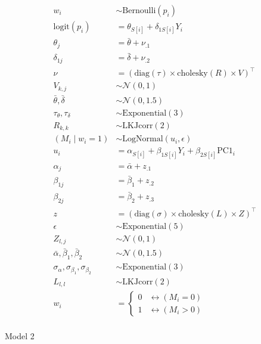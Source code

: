 \documentclass[
  letterpaper,
  DIV=11,
  numbers=noendperiod]{scrartcl}
\makeatletter
\let\oldparagraph\paragraph
\renewcommand{\paragraph}{
    \@ifstar
      \xxxParagraphStar
      \xxxParagraphNoStar
  }
\newcommand{\xxxParagraphStar}[1]{\oldparagraph*{#1}\mbox{}}
\newcommand{\xxxParagraphNoStar}[1]{\oldparagraph{#1}\mbox{}}
\makeatother
\begin{document}
\[
\begin{aligned}
w_i &\sim \mathrm{Bernoulli}(p_i) \\
\text{logit}(p_i) &= \theta_{S[i]} + \delta_{1S[i]} Y_i \\
\theta_j &= \bar{\theta} + \nu_{.1} \\
\delta_{1j} &= \bar{\delta} + \nu_{.2} \\
\nu &= \left( \mathrm{diag}(\tau) \times \mathrm{cholesky}(R) \times V \right)^\top \\
V_{k,j} &\sim \mathcal{N}(0, 1) \\
\bar{\theta}, \bar{\delta} &\sim \mathcal{N}(0, 1.5) \\
\tau_\theta, \tau_\delta &\sim \mathrm{Exponential}(3) \\
R_{k,k} &\sim \mathrm{LKJcorr}(2) \\
(M_i \mid w_i = 1) &\sim \mathrm{LogNormal}(u_i, \epsilon) \\
u_i &= \alpha_{S[i]} + \beta_{1S[i]} Y_i + \beta_{2S[i]} \mathrm{PC1}_i \\
\alpha_j &= \bar{\alpha} + z_{.1} \\
\beta_{1j} &= \bar{\beta}_1 + z_{.2} \\
\beta_{2j} &= \bar{\beta}_2 + z_{.3} \\
z &= \left( \mathrm{diag}(\sigma) \times \mathrm{cholesky}(L) \times Z \right)^\top \\
\epsilon &\sim \mathrm{Exponential}(5) \\
Z_{l,j} &\sim \mathcal{N}(0, 1) \\
\bar{\alpha}, \bar{\beta}_1, \bar{\beta}_2 &\sim \mathcal{N}(0, 1.5) \\
\sigma_\alpha, \sigma_{\beta_1}, \sigma_{\beta_2} &\sim \mathrm{Exponential}(3) \\
L_{l,l} &\sim \mathrm{LKJcorr}(2) \\
w_i &=
\begin{cases}
0 & \leftrightarrow (M_i = 0) \\
1 & \leftrightarrow (M_i > 0)
\end{cases}
\end{aligned}
\]

\paragraph{Model 2}\label{model-2}
\end{document}
